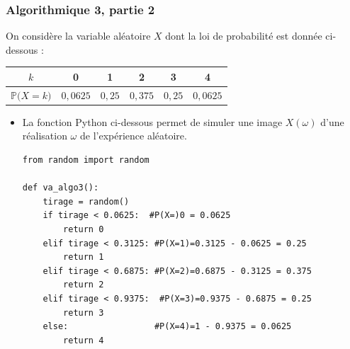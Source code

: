 \documentclass[11pt, hyperref={urlcolor=red,%
            linkcolor=blue, %
            colorlinks=true}]{beamer}
\newcommand{\proba}[1]{\mathbb{P}\big(#1\big)}
\begin{document}
\begin{frame}[fragile]
\frametitle{Algorithmique 3,  partie 2}

On considère la variable aléatoire $X$ dont la loi de probabilité est donnée ci-dessous :
	
	\begin{center}
\begin{tabular}{|c|c|c|c|c|c|}
\hline 
$k$ & 0 & 1 & 2 & 3 & 4 \\ 
\hline 
$\proba{X=k}$ & $0,0625$ & $0,25$ & $0,375$ & $0,25$ & $0,0625$ \\ 
\hline 
\end{tabular} 
	\end{center}
	
\begin{itemize} 
\pause \item La fonction Python ci-dessous permet de simuler une image $X(\omega)$ d'une réalisation $\omega$ de l'expérience aléatoire.


\begin{lstlisting}[style=rond]
from random import random

def va_algo3():
    tirage = random()
    if tirage < 0.0625:  #P(X=)0 = 0.0625
        return 0
    elif tirage < 0.3125: #P(X=1)=0.3125 - 0.0625 = 0.25
        return 1
    elif tirage < 0.6875: #P(X=2)=0.6875 - 0.3125 = 0.375
        return 2
    elif tirage < 0.9375:  #P(X=3)=0.9375 - 0.6875 = 0.25
        return 3
    else:                 #P(X=4)=1 - 0.9375 = 0.0625
        return 4
\end{lstlisting}


\end{itemize}


\end{frame}
\end{document}
